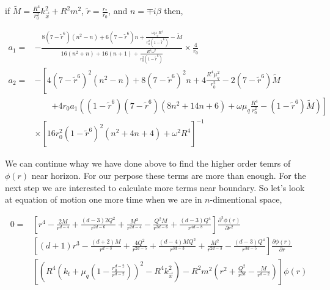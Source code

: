 if $\tilde{M} = \frac{R^4}{r_0^2}k_{\vec{x}}^2+R^2m^2$, $\tilde{r}=\frac{r_*}{r_0}$, and $n = \mp i\beta$ then,


\begin{align}
    a_1 =& -\frac{8(7-\tilde{r}^6)(n^2-n)+6(7-\tilde{r}^6)n+\frac{\omega\mu_qR^4}{r_0^2(1-\tilde{r}^6)}-\tilde{M}}{16(n^2+n)+16(n+1)+\frac{R^4\omega^2}{r_0^2(1-\tilde{r}^6)}} \times \frac{4}{r_0} \nonumber\\    
    a_2 =& -\left[4(7-\tilde{r}^6)^2(n^2-n) + 8(7-\tilde{r}^6)^2n + 4\frac{R^4\mu_q^2}{r_0^2} - 2(7-\tilde{r}^6)\tilde{M} \right.\nonumber\\
         & \qquad \left. + 4r_0a_1\left((1-\tilde{r}^6)(7-\tilde{r}^6)(8n^2+14n+6) + \omega\mu_q\frac{R^4}{r_0^2} - (1-\tilde{r}^6)\tilde{M} \right) \right] \nonumber\\
         & \times \left[ 16r_0^2(1-\tilde{r}^6)^2(n^2 + 4n + 4) + \omega^2R^4 \right]^{-1} 
\end{align}

We can continue whay we have done above to find the higher order temrs of $\phi(r)$ near horizon. For our perpose these terms are more than enough. For the next step we are interested to calculate more terms near boundary. So let's look at equation of motion one more time when we are in $n$-dimentional space,

\begin{align}
    0 =& \left[r^4 - \frac{2M}{r^{d-4}} + \frac{(d-3)2Q^2}{r^{2d-6}} + \frac{M^2}{r^{2d-4}} - \frac{Q^2M}{r^{3d-6}} + \frac{(d-3)Q^4}{r^{4d-8}}\right] \frac{\partial^2\phi(r)}{\partial r^2} \nonumber\\
       & \left[(d+1)r^3 - \frac{(d+2)M}{r^{d-3}} + \frac{4Q^2}{r^{2d-5}} + \frac{(d-4)MQ^2}{r^{3d-3}} + \frac{M^2}{r^{2d-3}} - \frac{(d-3)Q^4}{r^{3d-5}} \right] \frac{\partial\phi(r)}{\partial r} \nonumber\\
       & \left[\left(R^4 \left(k_t +\mu_q(1-\frac{r_0^{d-2}}{r^{d-2}})\right)^2 - R^4k_{\vec{x}}^2\right)-R^2m^2\left(r^2 + \frac{Q^2}{r^{2d}} - \frac{M}{r^{d-2}}\right)\right] \phi(r)
\end{align}

